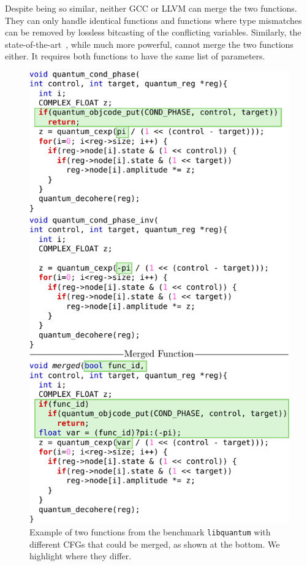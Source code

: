 Despite being so similar, neither GCC or LLVM can merge the two functions.
They can only handle identical functions and functions where type mismatches
can be removed by lossless bitcasting of the conflicting variables. Similarly, the
state-of-the-art~\cite{edler14}, while much more powerful, cannot merge the two
functions either. It requires both functions to have the same list of parameters.

\begin{figure}[t!]
  \centering
  \includegraphics[width=\linewidth]{figs/libquantum-example.pdf}
    \caption{Example of two functions from the benchmark \texttt{libquantum}
	  with different CFGs that could be merged, as shown at the bottom.
      We highlight where they differ.}
  \label{fig:libquantum-example}
\end{figure}

